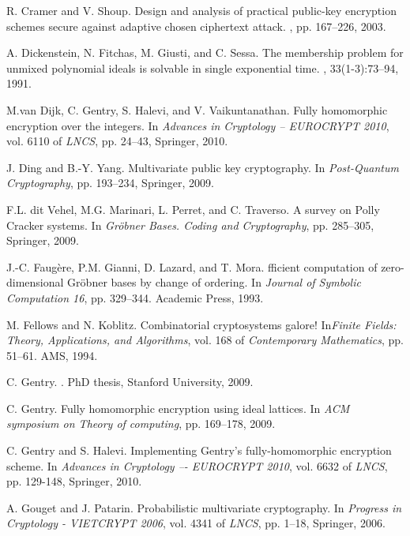 \documentclass[draft]{llncs}
\begin{document}
\begin{thebibliography}{10}
R. Cramer and V. Shoup.
\newblock Design and analysis of practical public-key encryption schemes secure against adaptive chosen ciphertext attack.
, pp. 167--226, 2003.

A. Dickenstein, N. Fitchas, M. Giusti, and C. Sessa.
\newblock The membership problem for unmixed polynomial ideals is solvable in single exponential time.
, 33(1-3):73--94, 1991.

M.van Dijk, C. Gentry, S. Halevi, and V. Vaikuntanathan.
\newblock Fully homomorphic encryption over the integers.
\newblock In {\em Advances in Cryptology -- EUROCRYPT 2010}, 
vol. 6110 of {\em LNCS}, pp. 24--43, Springer, 2010.

J. Ding and B.-Y. Yang.
\newblock Multivariate public key cryptography.
\newblock In {\em Post-Quantum Cryptography}, pp. 193--234, Springer, 2009.

F.L. dit Vehel, M.G. Marinari, L. Perret, and C. Traverso.
\newblock A survey on {P}olly {C}racker systems.
\newblock In {\em Gröbner Bases. Coding and Cryptography}, pp. 285--305, Springer, 2009.

J.-C. Faug{\`e}re, P.M. Gianni, D. Lazard, and T. Mora.
fficient computation of zero-dimensional {G}r{ö}bner bases by change of ordering.
\newblock In {\em Journal of Symbolic Computation 16}, pp. 329--344. Academic Press, 1993.

M. Fellows and N. Koblitz.
\newblock Combinatorial cryptosystems galore!
\newblock In{\em Finite Fields: Theory, Applications, and Algorithms}, vol. 168 of {\em Contemporary Mathematics}, pp. 51--61. AMS, 1994.

C. Gentry.
.
\newblock PhD thesis, Stanford University, 2009.

C. Gentry.
\newblock Fully homomorphic encryption using ideal lattices.
\newblock In {\em ACM symposium on Theory of computing}, pp. 169--178, 2009.

C. Gentry and S. Halevi.
\newblock Implementing {G}entry's fully-homomorphic encryption scheme.
\newblock In {\em Advances in Cryptology –- EUROCRYPT 2010}, 
vol. 6632 of {\em LNCS}, pp. 129-148, Springer, 2010. 

A. Gouget and J. Patarin.
\newblock Probabilistic multivariate cryptography.
\newblock In {\em Progress in Cryptology - VIETCRYPT 2006}, 
vol. 4341 of {\em LNCS}, pp. 1--18, Springer, 2006.


\end{thebibliography}
\end{document}
